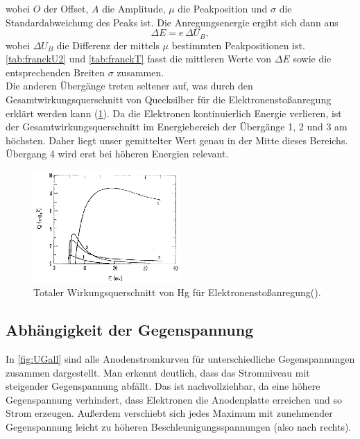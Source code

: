 \noindent wobei $O$ der Offset, $A$ die Amplitude, $\mu$ die Peakposition und $\sigma$ die Standardabweichung des Peaks ist. Die Anregungsenergie ergibt sich dann aus
\vspace{0.3cm}
\begin{equation}
  \Delta E = e \,\Delta U_B,
\end{equation}
\vspace{0.3cm}
\noindent wobei $\Delta U_B$ die Differenz der mittels $\mu$ bestimmten Peakpositionen ist. \cref{tab:franckU2} und \cref{tab:franckT} fasst die mittleren Werte von $\Delta E$ sowie die entsprechenden Breiten $\sigma$ zusammen.
\vspace{0.3cm}\\
Die anderen Übergänge treten seltener auf, was durch den Gesamtwirkungsquerschnitt von Quecksilber für die Elektronenstoßanregung erklärt werden kann (\cref{fig:Querschnitt}). 
Da die Elektronen kontinuierlich Energie verlieren, ist der Gesamtwirkungsquerschnitt im Energiebereich der Übergänge 1, 2 und 3 am höchsten. Daher liegt unser gemittelter Wert genau in der Mitte dieses Bereichs. Übergang 4 wird erst bei höheren Energien relevant.

\begin{figure}[H]
  \centering
  \includegraphics[width=0.5\textwidth]{figs/TotalerWirkungsquerschnitt.png}
  \caption{Totaler Wirkungsquerschnitt von Hg für Elektronenstoßanregung(\cite{praktikum4}).}
  \label{fig:Querschnitt}
\end{figure}

\subsection*{Abhängigkeit der Gegenspannung}

In \cref{fig:UGall} sind alle Anodenstromkurven für unterschiedliche Gegenspannungen zusammen dargestellt. Man erkennt deutlich, dass das Stromniveau mit steigender Gegenspannung abfällt. Das ist nachvollziehbar, da eine höhere Gegenspannung verhindert, dass Elektronen die Anodenplatte erreichen und so Strom erzeugen. Außerdem verschiebt sich jedes Maximum mit zunehmender Gegenspannung leicht zu höheren Beschleunigungsspannungen (also nach rechts).

